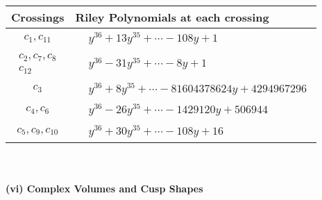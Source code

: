 \documentclass[1p]{elsarticle_modified}
\theoremstyle{definition}
\begin{document}
\begin{tabular}{m{50pt}|m{274pt}}
Crossings & \hspace{64pt}Riley Polynomials at each crossing \\
\hline $$\begin{aligned}c_{1},c_{11}\end{aligned}$$&$\begin{aligned}
&y^{36}+13 y^{35}+\cdots-108 y+1
\end{aligned}$\\
\hline $$\begin{aligned}c_{2},c_{7},c_{8}\\c_{12}\end{aligned}$$&$\begin{aligned}
&y^{36}-31 y^{35}+\cdots-8 y+1
\end{aligned}$\\
\hline $$\begin{aligned}c_{3}\end{aligned}$$&$\begin{aligned}
&y^{36}+8 y^{35}+\cdots-81604378624 y+4294967296
\end{aligned}$\\
\hline $$\begin{aligned}c_{4},c_{6}\end{aligned}$$&$\begin{aligned}
&y^{36}-26 y^{35}+\cdots-1429120 y+506944
\end{aligned}$\\
\hline $$\begin{aligned}c_{5},c_{9},c_{10}\end{aligned}$$&$\begin{aligned}
&y^{36}+30 y^{35}+\cdots-108 y+16
\end{aligned}$\\
\hline
\end{tabular}\\~\\
\newpage\flushleft \textbf{(vi) Complex Volumes and Cusp Shapes}
\end{document}
